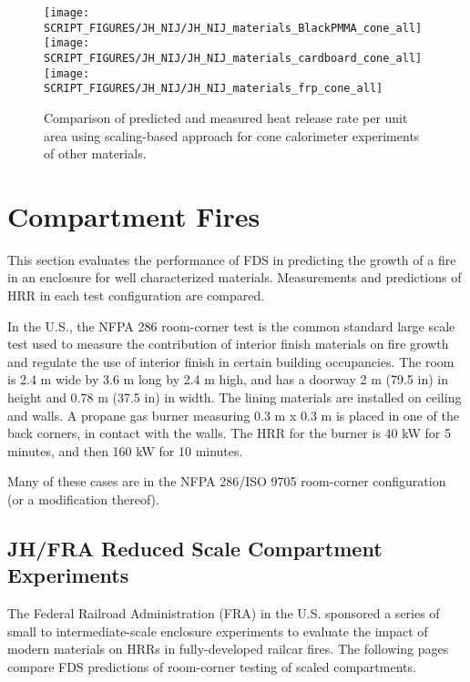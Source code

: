 \begin{figure}[h!]
\texttt{[image: SCRIPT\_FIGURES/JH\_NIJ/JH\_NIJ\_materials\_BlackPMMA\_cone\_all]} \\
\texttt{[image: SCRIPT\_FIGURES/JH\_NIJ/JH\_NIJ\_materials\_cardboard\_cone\_all]} \\
\texttt{[image: SCRIPT\_FIGURES/JH\_NIJ/JH\_NIJ\_materials\_frp\_cone\_all]} \\
\caption[Heat release rate per unit area of JH/NIJ materials using scaling model, other materials]
{Comparison of predicted and measured heat release rate per unit area using scaling-based approach for cone calorimeter experiments of other materials.}
\label{JH_NIJ_HRR_other}
\end{figure}

\clearpage

\section{Compartment Fires}\label{sec_Compartment_Fires}

This section evaluates the performance of FDS in predicting the growth of a fire in an enclosure for well characterized materials.
Measurements and predictions of HRR in each test configuration are compared.

In the U.S., the NFPA 286 room-corner test is the common standard large scale test used to measure the contribution of interior finish materials on fire growth and regulate the use of interior finish in certain building occupancies.
The room is 2.4 m wide by 3.6 m long by 2.4 m high, and has a doorway 2 m (79.5 in) in height and 0.78 m (37.5 in) in width.
The lining materials are installed on ceiling and walls. A propane gas burner measuring 0.3 m x 0.3 m is placed in one of the back corners, in contact with the walls.
The HRR for the burner is 40 kW for 5 minutes, and then 160 kW for 10 minutes.

Many of these cases are in the NFPA 286/ISO 9705 room-corner configuration (or a modification thereof).

\subsection{JH/FRA Reduced Scale Compartment Experiments}\label{sec_JH_FRA_Scaled_Compartments}

The Federal Railroad Administration (FRA) in the U.S. sponsored a series of small to intermediate-scale enclosure experiments to evaluate the impact of modern materials on HRRs in fully-developed railcar fires.
The following pages compare FDS predictions of room-corner testing of scaled compartments.

